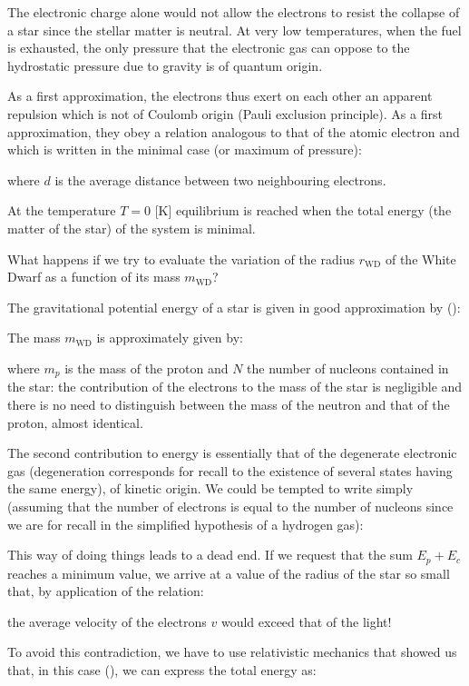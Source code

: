 	The electronic charge alone would not allow the electrons to resist the collapse of a star since the stellar matter is neutral. At very low temperatures, when the fuel is exhausted, the only pressure that the electronic gas can oppose to the hydrostatic pressure due to gravity is of quantum origin.
	
	As a first approximation, the electrons thus exert on each other an apparent repulsion which is not of Coulomb origin (Pauli exclusion principle). As a first approximation, they obey a relation analogous to that of the atomic electron and which is written in the minimal case (or maximum of pressure):
	
	where $d$ is the average distance between two neighbouring electrons.

	At the temperature $T=0$ [K] equilibrium is reached when the total energy (the matter of the star) of the system is minimal.
	
	What happens if we try to evaluate the variation of the radius $r_\text{WD}$ of the White Dwarf as a function of its mass $m_\text{WD}$?
	
	The gravitational potential energy of a star is given in good approximation by ():
	
	The mass $m_\text{WD}$ is approximately given by:
	
	where $m_p$ is the mass of the proton and $N$ the number of nucleons contained in the star: the contribution of the electrons to the mass of the star is negligible and there is no need to distinguish between the mass of the neutron and that of the proton, almost identical.
	
	The second contribution to energy is essentially that of the degenerate electronic gas (degeneration corresponds for recall to the existence of several states having the same energy), of kinetic origin. We could be tempted to write simply (assuming that the number of electrons is equal to the number of nucleons since we are for recall in the simplified hypothesis of a hydrogen gas):
	
	This way of doing things leads to a dead end. If we request that the sum $E_p+E_c$ reaches a minimum value, we arrive at a value of the radius of the star so small that, by application of the relation:
	
	the average velocity of the electrons $v$ would exceed that of the light!
	
	To avoid this contradiction, we have to use relativistic mechanics that showed us that, in this case (), we can express the total energy as:
	
